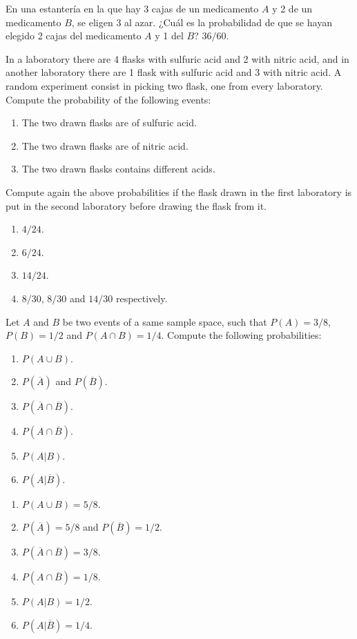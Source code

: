 
{En una estantería en la que hay 3 cajas de un medicamento $A$ y 2 de un medicamento $B$, se eligen 3 al azar.
¿Cuál es la probabilidad de que se hayan elegido 2 cajas del medicamento $A$ y 1 del $B$?
}
{$36/60$.}
{}


{In a laboratory there are 4 flasks with sulfuric acid and 2 with nitric acid, and in another laboratory there are 1 flask with sulfuric acid and 3 with nitric acid. 
A random experiment consist in picking two flask, one from every laboratory. 
Compute the probability of the following events:

\begin{enumerate}
\item The two drawn flasks are of sulfuric acid.
\item The two drawn flasks are of nitric acid.
\item The two drawn flasks contains different acids.
\end{enumerate}
Compute again the above probabilities if the flask drawn in the first laboratory is put in the second laboratory before drawing the flask from it. 
}
{
\begin{enumerate}
\item $4/24$.
\item $6/24$.
\item $14/24$.
\item $8/30$, $8/30$ and $14/30$ respectively. 
\end{enumerate}
}
{}


{Let $A$ and $B$ be two events of a same sample space, such that $P(A)=3/8$, $P(B)=1/2$ and $P(A\cap B)=1/4$.
Compute the following probabilities:

\begin{enumerate}
\item  $P(A\cup B)$.
\item  $P(\overline{A})$ and $P(\overline{B})$.
\item  $P(\overline{A}\cap \overline{B})$.
\item  $P(A\cap \overline{B})$.
\item  $P(A|B)$.
\item  $P(A|\overline{B})$.
\end{enumerate}
}
{
\begin{enumerate}
\item  $P(A\cup B)=5/8$.
\item  $P(\overline{A})=5/8$ and $P(\overline{B})=1/2$.
\item  $P(\overline{A}\cap \overline{B})=3/8$.
\item  $P(A\cap \overline{B})=1/8$.
\item  $P(A|B)=1/2$.
\item  $P(A|\overline{B})=1/4$.
\end{enumerate}
}
{}


